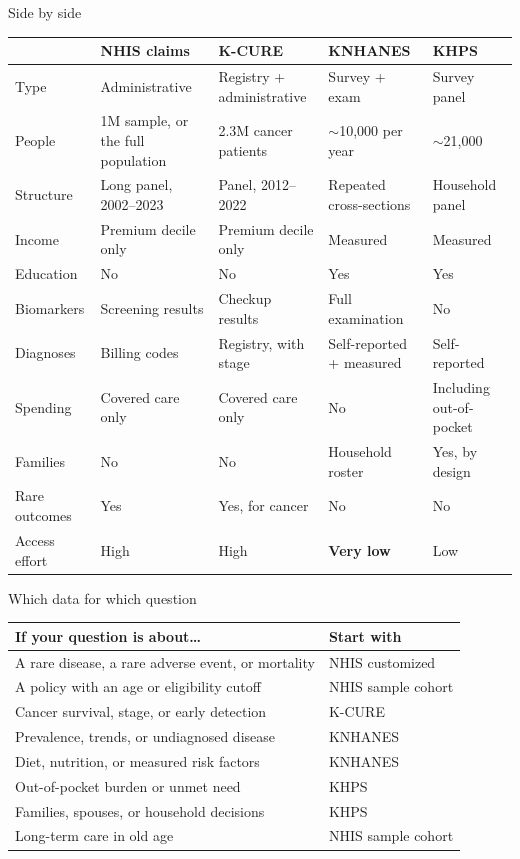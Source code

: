\documentclass[aspectratio=169,11pt]{beamer}
\newcommand{\hl}[1]{\textbf{\color{kdgreen}#1}}
\begin{document}
\begin{frame}{Side by side}
  \vspace{-2pt}
  \renewcommand{\arraystretch}{1.22}
  {\scriptsize
  \begin{tabularx}{\textwidth}{@{}l >{\raggedright\arraybackslash}X >{\raggedright\arraybackslash}X >{\raggedright\arraybackslash}X >{\raggedright\arraybackslash}X@{}}
    \toprule
    & \textbf{NHIS claims} & \textbf{K-CURE} & \textbf{KNHANES} & \textbf{KHPS} \\
    \midrule
    Type & Administrative & Registry + administrative & Survey + exam & Survey panel \\
    People & 1M sample, or the full population & 2.3M cancer patients & $\sim$10,000 per year & $\sim$21,000 \\
    Structure & Long panel, 2002--2023 & Panel, 2012--2022 & Repeated cross-sections & Household panel \\
    Income & Premium decile only & Premium decile only & Measured & Measured \\
    Education & No & No & Yes & Yes \\
    Biomarkers & Screening results & Checkup results & Full examination & No \\
    Diagnoses & Billing codes & Registry, with stage & Self-reported + measured & Self-reported \\
    Spending & Covered care only & Covered care only & No & Including out-of-pocket \\
    Families & No & No & Household roster & Yes, by design \\
    Rare outcomes & Yes & Yes, for cancer & No & No \\
    Access effort & High & High & \hl{Very low} & Low \\
    \bottomrule
  \end{tabularx}}
\end{frame}

\begin{frame}{Which data for which question}
  \vspace{2pt}
  \renewcommand{\arraystretch}{1.45}
  \begin{tabularx}{\textwidth}{@{}>{\raggedright\arraybackslash}X l@{}}
    \toprule
    \textbf{If your question is about\ldots} & \textbf{Start with} \\
    \midrule
    A rare disease, a rare adverse event, or mortality & NHIS customized \\
    A policy with an age or eligibility cutoff & NHIS sample cohort \\
    Cancer survival, stage, or early detection & K-CURE \\
    Prevalence, trends, or undiagnosed disease & KNHANES \\
    Diet, nutrition, or measured risk factors & KNHANES \\
    Out-of-pocket burden or unmet need & KHPS \\
    Families, spouses, or household decisions & KHPS \\
    Long-term care in old age & NHIS sample cohort \\
    \bottomrule
  \end{tabularx}
\end{frame}
\end{document}

